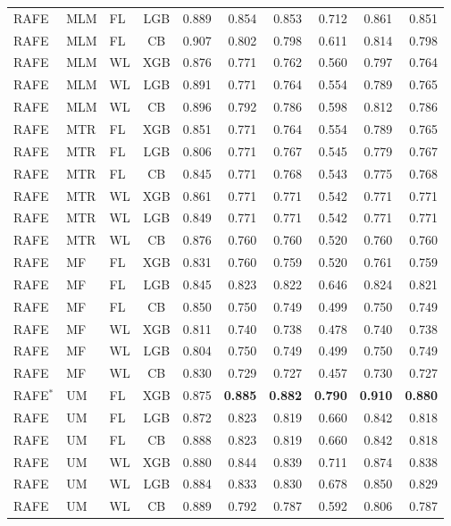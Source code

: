 \documentclass[9pt,a4paper]{article}
\begin{document}
\begin{scriptsize}
\begin{longtable}{lllcrrrrrr}
RAFE & MLM & FL & LGB & 0.889 & 0.854 & 0.853 & 0.712 & 0.861 & 0.851 \\
RAFE & MLM & FL & CB  & 0.907 & 0.802 & 0.798 & 0.611 & 0.814 & 0.798 \\
RAFE & MLM & WL & XGB & 0.876 & 0.771 & 0.762 & 0.560 & 0.797 & 0.764 \\
RAFE & MLM & WL & LGB & 0.891 & 0.771 & 0.764 & 0.554 & 0.789 & 0.765 \\
RAFE & MLM & WL & CB  & 0.896 & 0.792 & 0.786 & 0.598 & 0.812 & 0.786 \\
RAFE & MTR & FL & XGB & 0.851 & 0.771 & 0.764 & 0.554 & 0.789 & 0.765 \\
RAFE & MTR & FL & LGB & 0.806 & 0.771 & 0.767 & 0.545 & 0.779 & 0.767 \\
RAFE & MTR & FL & CB  & 0.845 & 0.771 & 0.768 & 0.543 & 0.775 & 0.768 \\
RAFE & MTR & WL & XGB & 0.861 & 0.771 & 0.771 & 0.542 & 0.771 & 0.771 \\
RAFE & MTR & WL & LGB & 0.849 & 0.771 & 0.771 & 0.542 & 0.771 & 0.771 \\
RAFE & MTR & WL & CB  & 0.876 & 0.760 & 0.760 & 0.520 & 0.760 & 0.760 \\
RAFE & MF  & FL & XGB & 0.831 & 0.760 & 0.759 & 0.520 & 0.761 & 0.759 \\
RAFE & MF  & FL & LGB & 0.845 & 0.823 & 0.822 & 0.646 & 0.824 & 0.821 \\
RAFE & MF  & FL & CB  & 0.850 & 0.750 & 0.749 & 0.499 & 0.750 & 0.749 \\
RAFE & MF  & WL & XGB & 0.811 & 0.740 & 0.738 & 0.478 & 0.740 & 0.738 \\
RAFE & MF  & WL & LGB & 0.804 & 0.750 & 0.749 & 0.499 & 0.750 & 0.749 \\
RAFE & MF  & WL & CB  & 0.830 & 0.729 & 0.727 & 0.457 & 0.730 & 0.727 \\
RAFE$^*$ & UM & FL & XGB & 0.875 & \textbf{0.885} & \textbf{0.882} & \textbf{0.790} & \textbf{0.910} & \textbf{0.880} \\
RAFE & UM  & FL & LGB & 0.872 & 0.823 & 0.819 & 0.660 & 0.842 & 0.818 \\
RAFE & UM  & FL & CB  & 0.888 & 0.823 & 0.819 & 0.660 & 0.842 & 0.818 \\
RAFE & UM  & WL & XGB & 0.880 & 0.844 & 0.839 & 0.711 & 0.874 & 0.838 \\
RAFE & UM  & WL & LGB & 0.884 & 0.833 & 0.830 & 0.678 & 0.850 & 0.829 \\
RAFE & UM  & WL & CB  & 0.889 & 0.792 & 0.787 & 0.592 & 0.806 & 0.787 \\
\end{longtable}
\end{scriptsize}
\end{document}
